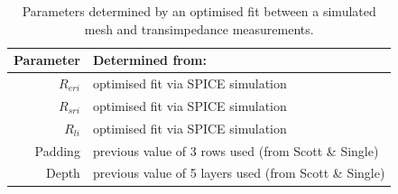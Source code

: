     \begin{table}
      \begin{center}
        \begin{tabular} {r | l}
          Parameter & Determined from:\\
          \hline
          $R_{eri}$ & optimised fit via SPICE simulation\\
          $R_{sri}$ & optimised fit via SPICE simulation\\
          $R_{li}$ & optimised fit via SPICE simulation\\
          Padding & previous value of 3 rows used (from Scott \& Single)\\
          Depth & previous value of 5 layers used (from Scott \& Single)
        \end{tabular}
      \end{center}
      \caption{\label{tab:pt2-parameterDesc-ResistorMesh}Parameters determined by an optimised fit between a simulated mesh and transimpedance measurements.}
    \end{table}


